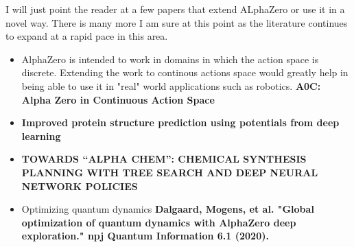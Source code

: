 I will just point the reader at a few papers that extend ALphaZero or use it in a novel way. There is many more I am sure at this point as the literature continues to expand at a rapid pace in this area. 

\begin{itemize}
    \item AlphaZero is intended to work in domains in which the action space is discrete. Extending the work to continous actions space would greatly help in being able to use it in "real" world applications such as robotics.
    \textbf{A0C: Alpha Zero in Continuous Action Space}
    \cite{aocalphazero}
    
    \item \textbf{Improved protein structure prediction using potentials from deep learning}
    \cite{alphafold}
    
    \item \textbf{TOWARDS “ALPHA CHEM”: CHEMICAL SYNTHESIS PLANNING WITH TREE SEARCH AND
    DEEP NEURAL NETWORK POLICIES}
    \cite{alphachem}
    
    \item Optimizing quantum dynamics
    \textbf{Dalgaard, Mogens, et al. "Global optimization of quantum dynamics with AlphaZero deep exploration." npj Quantum Information 6.1 (2020).}
    \cite{alphaquantum} 
    
\end{itemize}

